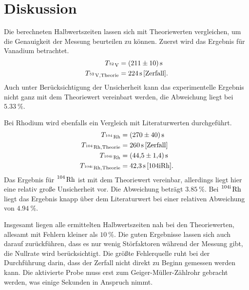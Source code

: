 \section{Diskussion}
\label{sec:Diskussion}

Die berechneten Halbwertszeiten lassen sich mit Theoriewerten vergleichen, um die Genauigkeit der
Messung beurteilen zu können.
Zuerst wird das Ergebnis für Vanadium betrachtet.
\begin{align*}
    T_{\ce{^52 V}} &= \qty{211+-10}{\second} \\
    T_{\ce{^52 V}, \text{Theorie}} &= \qty{224}{\second}\,\text{\cite{Zerfall}}.
\end{align*}
Auch unter Berücksichtigung der Unsicherheit kann das experimentelle Ergebnis nicht ganz mit
dem Theoriewert vereinbart werden, die Abweichung liegt bei $\qty{5.33}{\percent}$.

Bei Rhodium wird ebenfalls ein Vergleich mit Literaturwerten durchgeführt.
\begin{align*}
    T_{\ce{^104 Rh}} &= \qty{270+-40}{\second} \\
    T_{\ce{^104 Rh}, \text{Theorie}} &= \qty{260}{\second}\,\text{\cite{Zerfall}} \\
    T_{\ce{^{104\text{i}} Rh}} &= \qty{44.5+-1.4}{\second} \\
    T_{\ce{^{104\text{i}} Rh}, \text{Theorie}} &= \qty{42.3}{\second}\,\text{\cite{104iRh}}.
\end{align*}
Das Ergebnis für $\ce{^104 Rh}$ ist mit dem Theoriewert vereinbar, allerdings liegt hier eine
relativ große Unsicherheit vor. Die Abweichung beträgt $\qty{3.85}{\percent}$.
Bei $\ce{^{104\text{i}} Rh}$ liegt das Ergebnis knapp über dem Literaturwert bei einer relativen
Abweichung von $\qty{4.94}{\percent}$.

Insgesamt liegen alle ermittelten Halbwertszeiten nah bei den Theoriewerten, allesamt mit Fehlern kleiner
als $\qty{10}{\percent}$. Die guten Ergebnisse lassen sich auch darauf zurückführen, dass es nur wenig
Störfaktoren während der Messung gibt, die Nullrate wird berücksichtigt.
Die größte Fehlerquelle ruht bei der Durchführung darin, dass der Zerfall nicht direkt zu Beginn gemessen
werden kann. Die aktivierte Probe muss erst zum Geiger-Müller-Zählrohr gebracht werden, was einige Sekunden
in Anspruch nimmt.